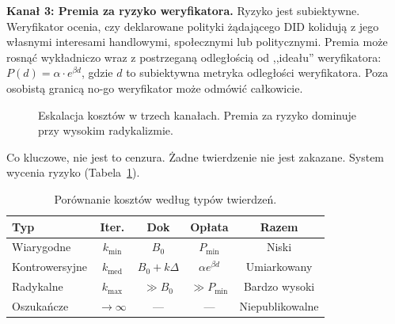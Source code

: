 \documentclass[11pt,a4paper,twocolumn]{article}
\begin{document}
\textbf{Kanał 3: Premia za ryzyko weryfikatora.} Ryzyko jest subiektywne. Weryfikator ocenia, czy deklarowane polityki żądającego DID kolidują z jego własnymi interesami handlowymi, społecznymi lub politycznymi. Premia może rosnąć wykładniczo wraz z postrzeganą odległością od ,,ideału'' weryfikatora: $P(d) = \alpha \cdot e^{\beta d}$, gdzie $d$ to subiektywna metryka odległości weryfikatora. Poza osobistą granicą no-go weryfikator może odmówić całkowicie.

\begin{figure}[ht]
\centering
{}
\caption{Eskalacja kosztów w trzech kanałach. Premia za ryzyko dominuje przy wysokim radykalizmie.}
\label{fig:radicalism}
\end{figure}

Co kluczowe, nie jest to cenzura. Żadne twierdzenie nie jest zakazane. System wycenia ryzyko (Tabela~\ref{tab:costs}).

\begin{table}[ht]
\centering
\caption{Porównanie kosztów według typów twierdzeń.}
\label{tab:costs}
\footnotesize
\begin{tabular}{@{}lcccc@{}}
\toprule
\textbf{Typ} & \textbf{Iter.} & \textbf{Dok} & \textbf{Opłata} & \textbf{Razem} \\
\midrule
Wiarygodne & $k_{\min}$ & $B_0$ & $P_{\min}$ & Niski \\
Kontrowersyjne & $k_{\text{med}}$ & $B_0{+}k\Delta$ & $\alpha e^{\beta d}$ & Umiarkowany \\
Radykalne & $k_{\max}$ & $\gg B_0$ & $\gg P_{\min}$ & Bardzo wysoki \\
Oszukańcze & $\to\infty$ & --- & --- & Niepublikowalne \\
\bottomrule
\end{tabular}
\end{table}
\end{document}
